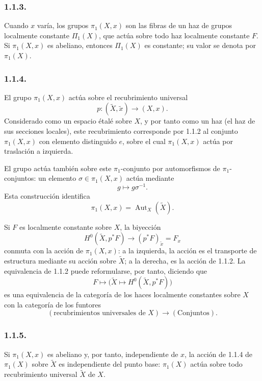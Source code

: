 \subsubsection*{1.1.3.}
Cuando $x$ varía, los grupos $\pi_1(X,x)$ son las fibras de un haz de grupos
localmente constante $\Pi_1(X)$, que actúa sobre todo haz localmente constante
$F$. Si $\pi_1(X,x)$ es abeliano, entonces $\Pi_1(X)$ es constante; su valor
se denota por $\pi_1(X)$.

\subsubsection*{1.1.4.}
El grupo $\pi_1(X,x)$ actúa sobre el recubrimiento universal
\[
p:(\widetilde X,\widetilde x)\longrightarrow(X,x).
\]
Considerado como un espacio étalé sobre $X$, y por tanto como un haz (el haz de
sus secciones locales), este recubrimiento corresponde por 1.1.2 al conjunto
$\pi_1(X,x)$ con elemento distinguido $e$, sobre el cual $\pi_1(X,x)$ actúa
por traslación a izquierda.

\pageoriginale

El grupo actúa también sobre este $\pi_1$-conjunto por automorfismos de
$\pi_1$-conjuntos: un elemento $\sigma\in\pi_1(X,x)$ actúa mediante
\[
g\longmapsto g\sigma^{-1}.
\]
Esta construcción identifica
\[
\pi_1(X,x)=\operatorname{Aut}_X(\widetilde X).
\]

Si $F$ es localmente constante sobre $X$, la biyección
\begin{equation}\tag{1.1.4.1}
H^0(\widetilde X,p^*F)
\longrightarrow(p^*F)_{\widetilde x}=F_x
\end{equation}
conmuta con la acción de $\pi_1(X,x)$: a la izquierda, la acción es el
transporte de estructura mediante su acción sobre $\widetilde X$; a la
derecha, es la acción de 1.1.2. La equivalencia de 1.1.2 puede reformularse,
por tanto, diciendo que
\[
F\longmapsto
\bigl(\widetilde X\longmapsto H^0(\widetilde X,p^*F)\bigr)
\]
es una equivalencia de la categoría de los haces localmente constantes sobre
$X$ con la categoría de los funtores
\[
(\text{recubrimientos universales de }X)\longrightarrow(\text{Conjuntos}).
\]

\subsubsection*{1.1.5.}
Si $\pi_1(X,x)$ es abeliano y, por tanto, independiente de $x$, la acción de
1.1.4 de $\pi_1(X)$ sobre $\widetilde X$ es independiente del punto base:
$\pi_1(X)$ actúa sobre todo recubrimiento universal $\widetilde X$ de $X$.

